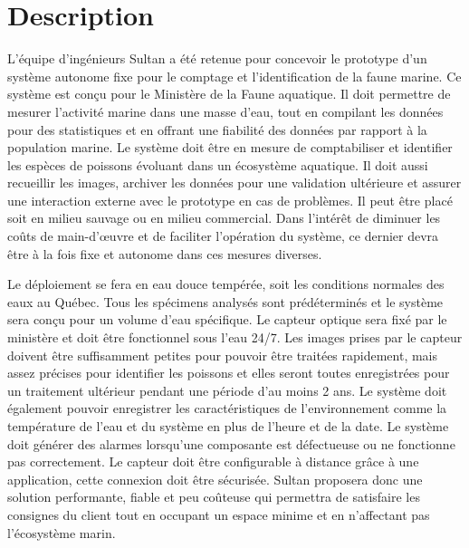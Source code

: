 
%
%

\chapter{Description}
\label{s:description}

L’équipe d’ingénieurs Sultan a été retenue pour concevoir le prototype d’un système autonome fixe pour le comptage et l’identification de la faune marine.
Ce système est conçu pour le Ministère de la Faune aquatique.
\wl
Il doit permettre de mesurer l’activité marine dans une masse d’eau, tout en compilant les données pour des statistiques et en offrant une fiabilité des données par rapport à la population marine.
Le système doit être en mesure de comptabiliser et identifier les espèces de poissons évoluant dans un écosystème aquatique.
Il doit aussi recueillir les images, archiver les données pour une validation ultérieure et assurer une interaction externe avec le prototype en cas de problèmes. Il peut être placé soit en milieu sauvage ou en milieu commercial.
Dans l’intérêt de diminuer les coûts de main-d’œuvre et de faciliter l’opération du système, ce dernier devra être à la fois fixe et autonome dans ces mesures diverses.

Le déploiement se fera en eau douce tempérée, soit les conditions normales des eaux au Québec.
Tous les spécimens analysés sont prédéterminés et le système sera conçu pour un volume d’eau spécifique.
Le capteur optique sera fixé par le ministère et doit être fonctionnel sous l’eau 24/7.
Les images prises par le capteur doivent être suffisamment petites pour pouvoir être traitées rapidement, mais assez précises pour identifier les poissons et elles seront toutes enregistrées pour un traitement ultérieur pendant une période d’au moins 2 ans.
Le système doit également pouvoir enregistrer les caractéristiques de l’environnement comme la température de l’eau et du système en plus de l’heure et de la date.
Le système doit générer des alarmes lorsqu’une composante est défectueuse ou ne fonctionne pas correctement.
Le capteur doit être configurable à distance grâce à une application, cette connexion doit être sécurisée.
\wl
Sultan proposera donc une solution performante, fiable et peu coûteuse qui permettra de satisfaire les consignes du client tout en occupant un espace minime et en n’affectant pas l’écosystème marin.


